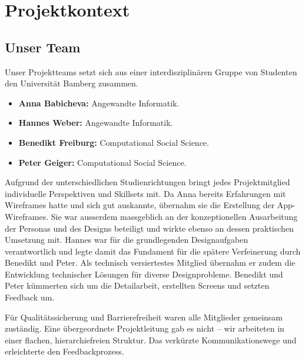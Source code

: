 \section{Projektkontext}
\subsection{Unser Team}
Unser Projektteams setzt sich aus einer interdisziplinären Gruppe von Studenten den Universität Bamberg zusammen.

\begin{itemize}
	\item \textbf{Anna Babicheva:} Angewandte Informatik.
	\item \textbf{Hannes Weber:} Angewandte Informatik.
	\item \textbf{Benedikt Freiburg:} Computational Social Science.
	\item \textbf{Peter Geiger:} Computational Social Science.
\end{itemize}

Aufgrund der unterschiedlichen Studienrichtungen bringt jedes Projektmitglied individuelle Perspektiven und Skillsets mit. Da Anna bereits Erfahrungen mit Wireframes hatte und sich gut auskannte, übernahm sie die Erstellung der App-Wireframes. Sie war ausserdem massgeblich an der konzeptionellen Ausarbeitung der Personas und des Designs beteiligt und wirkte ebenso an dessen praktischen Umsetzung mit. Hannes war für die grundlegenden Designaufgaben verantwortlich und legte damit das Fundament für die spätere Verfeinerung durch Benedikt und Peter. Als technisch versiertestes Mitglied übernahm er zudem die Entwicklung technischer Lösungen für diverse Designprobleme. Benedikt und Peter kümmerten sich um die Detailarbeit, erstellten Screens und setzten Feedback um.

Für Qualitätssicherung und Barrierefreiheit waren alle Mitglieder gemeinsam zuständig. Eine übergeordnete Projektleitung gab es nicht – wir arbeiteten in einer flachen, hierarchiefreien Struktur. Das verkürzte Kommunikationswege und erleichterte den Feedbackprozess.

